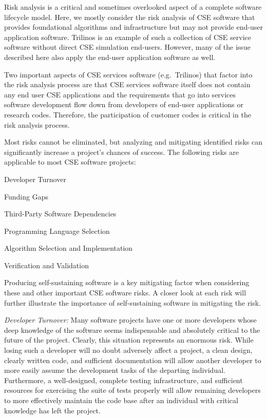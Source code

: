 \documentclass[11pt]{SANDreport}
\begin{document}
Risk analysis is a critical and sometimes overlooked aspect of a complete software lifecycle model.  Here, we mostly consider the risk analysis of CSE software that provides foundational algorithms and infrastructure but may not provide end-user application software. Trilinos is an example of such a collection of CSE service software without direct CSE simulation end-users.  However, many of the issue described here also apply the end-user application software as well.

Two important aspects of CSE services software (e.g.\ Trilinos) that factor into the risk analysis process are that CSE services software itself does not contain any end user CSE applications and the requirements that go into services software development flow down from developers of end-user applications or research codes.  Therefore, the participation of customer codes is critical in the risk analysis process.

Most risks cannot be eliminated, but analyzing and mitigating identified risks can significantly increase a project's chances of success.  The following risks are applicable to most CSE software projects:

\begin{compactitem}

{}\item Developer Turnover

{}\item Funding Gaps

{}\item Third-Party Software Dependencies

{}\item Programming Language Selection

{}\item Algorithm Selection and Implementation

{}\item Verification and Validation

\end{compactitem}

Producing self-sustaining software is a key mitigating factor when considering these and other important CSE software risks.  A closer look at each risk will further illustrate the importance of self-sustaining software in mitigating the risk.

{}\textit{Developer Turnover:} Many software projects have one or more developers whose deep knowledge of the software seems indispensable and absolutely critical to the future of the project.  Clearly, this situation represents an enormous risk.  While losing such a developer will no doubt adversely affect a project, a clean design, clearly written code, and sufficient documentation will allow another developer to more easily assume the development tasks of the departing individual.  Furthermore, a well-designed, complete testing infrastructure, and sufficient resources for exercising the suite of tests properly will allow remaining developers to more effectively maintain the code base after an individual with critical knowledge has left the project.
\end{document}

